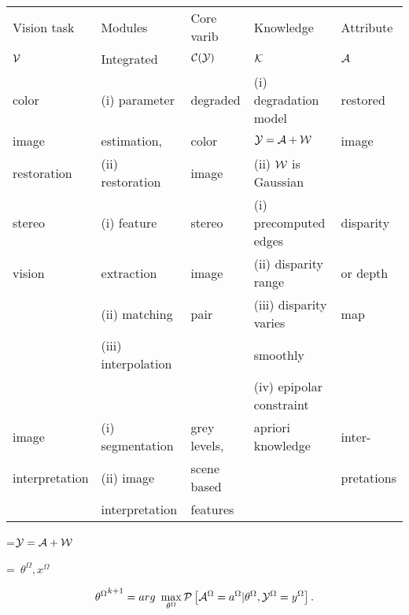 {\newpage
\clearpage
\samepage \begin{table}\begin{center}
 
\begin{tabular}{||l|l|l|l|l||} \hline \hline
Vision task & Modules  & Core varib & Knowledge & Attribute  \\ 
 ${\cal{V}}$            & Integrated & ${\cal{C(Y)}}$  &    ${\cal{K}}$       & ${\cal{A}}$ \\  \hline \hline
color & (i) parameter  & degraded  & (i) degradation model& restored \\ 
image & estimation, & color & ${\cal{Y}}  = {\cal{A}}  + {\cal{W}}$& image\\ 
restoration & (ii) restoration &image & (ii) ${\cal{W}}$ is Gaussian & \\   \hline

stereo &(i) feature & stereo&(i) precomputed edges & disparity \\ 
vision &extraction  & image& (ii) disparity range & or depth\\ 
       & (ii) matching &  pair & (iii) disparity varies & map \\ 
       & (iii) interpolation&   & smoothly & \\ 
&  && (iv) epipolar constraint & \\  \hline
image& (i) segmentation        & grey levels,&  apriori knowledge   &
inter- \\ 
 interpretation &(ii) image      &scene based  &  & pretations\\ 
              & interpretation &  features     &   & \\ 
\hline \hline
\end{tabular}
\end{center}
 

\label{tab:probs}
\end{table}
}

{\newpage
\clearpage
\samepage \setbox\sizebox=\hbox{${\cal{Y}} ={\cal{A}}+{\cal{W}}$}\box\sizebox
}

{\newpage
\clearpage
\samepage \setbox\sizebox=\hbox{%
$\theta^\Omega, x^\Omega$}\box\sizebox
}

{\newpage
\clearpage
\samepage \begin{equation}%
{\theta^\Omega}^{k+1}=arg\ \max_{\theta^\Omega} 
\P \left [ \X^\Omega={a^\Omega} | \theta^\Omega, 
\Y^\Omega=y^\Omega \right ] .
\label{eq:un_sup_parameter}
\end{equation}
}


